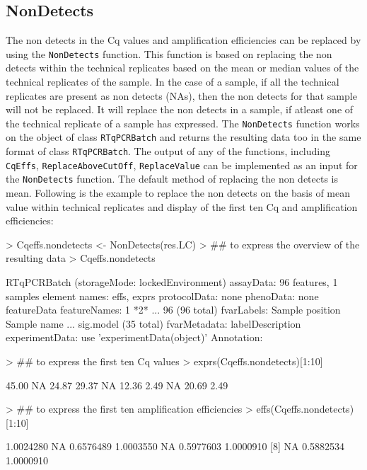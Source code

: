 \documentclass[11pt]{article}
\newcommand{\code}[1]{{\tt #1}}
\begin{document}
\subsection{NonDetects} 
The non detects in the Cq values and amplification efficiencies can be replaced by using the \code{NonDetects} function. This function is based on replacing the non detects within the technical replicates based on the mean or median values of the technical replicates of the sample. In the case of a sample, if all the technical replicates are present as non detects (NAs), then the non detects for that sample will not be replaced. It will replace the non detects in a sample, if atleast one of the technical replicate of a sample has expressed. The \code{NonDetects} function works on the object of class \code{RTqPCRBatch} and returns the resulting data too in the same format of class \code{RTqPCRBatch}. The output of any of the functions, including \code{CqEffs}, \code{ReplaceAboveCutOff}, \code{ReplaceValue} can be implemented as an input for the \code{NonDetects} function. The default method of replacing the non detects is mean. Following is the example to replace the non detects on the basis of mean value within technical replicates and display of the first ten Cq and amplification efficiencies:

\begin{Schunk}
\begin{Sinput}
> Cqeffs.nondetects <- NonDetects(res.LC)
> ## to express the overview of the resulting data
> Cqeffs.nondetects 
\end{Sinput}
\begin{Soutput}
RTqPCRBatch (storageMode: lockedEnvironment)
assayData: 96 features, 1 samples 
  element names: effs, exprs 
protocolData: none
phenoData: none
featureData
  featureNames: 1 *2* ... 96 (96 total)
  fvarLabels: Sample position Sample name ... sig.model (35 total)
  fvarMetadata: labelDescription
experimentData: use 'experimentData(object)'
Annotation:  
\end{Soutput}
\begin{Sinput}
> ## to express the first ten Cq values
> exprs(Cqeffs.nondetects)[1:10]
\end{Sinput}
\begin{Soutput}
 [1] 45.00    NA 24.87 29.37    NA 12.36  2.49    NA 20.69  2.49
\end{Soutput}
\begin{Sinput}
> ## to express the first ten amplification efficiencies
> effs(Cqeffs.nondetects)[1:10] 
\end{Sinput}
\begin{Soutput}
 [1] 1.0024280        NA 0.6576489 1.0003550        NA 0.5977603 1.0000910
 [8]        NA 0.5882534 1.0000910
\end{Soutput}
\end{Schunk}
\end{document}
